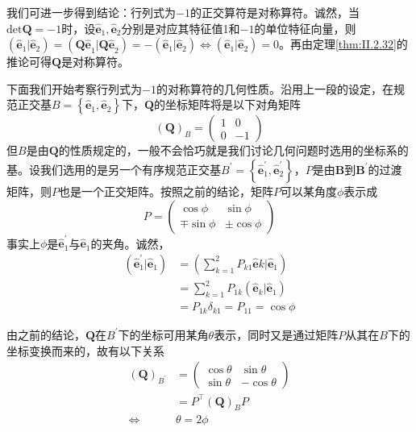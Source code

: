 \documentclass[main.tex]{subfiles}
\begin{document}
我们可进一步得到结论：行列式为$-1$的正交算符是对称算符。诚然，当$\mathrm{det}\mathbf{Q}=-1$时，设$\mathbf{\hat{e}}_1,\mathbf{\hat{e}}_2$分别是对应其特征值1和$-1$的单位特征向量，则$\left(\mathbf{\hat{e}}_1|\mathbf{\hat{e}}_2\right)=\left(\mathbf{Q\hat{e}}_1|\mathbf{Q\hat{e}}_2\right)=-\left(\mathbf{\hat{e}}_1|\mathbf{\hat{e}}_2\right)\Leftrightarrow\left(\mathbf{\hat{e}}_1|\mathbf{\hat{e}}_2\right)=0$。再由定理\ref{thm:II.2.32}的推论可得$\mathbf{Q}$是对称算符。

下面我们开始考察行列式为$-1$的对称算符的几何性质。沿用上一段的设定，在规范正交基$B=\left\{\mathbf{\hat{e}}_1,\mathbf{\hat{e}}_2\right\}$下，$\mathbf{Q}$的坐标矩阵将是以下对角矩阵
\[\left(\mathbf{Q}\right)_B=\left(\begin{array}{cc}1&0\\0&-1\end{array}\right)\]
但$B$是由$\mathbf{Q}$的性质规定的，一般不会恰巧就是我们讨论几何问题时选用的坐标系的基。设我们选用的是另一个有序规范正交基$B^\prime=\left\{\mathbf{\hat{e}}^\prime_1,\mathbf{\hat{e}}^\prime_2\right\}$，$P$是由$\mathbf{B}$到$\mathbf{B}^\prime$的过渡矩阵，则$P$也是一个正交矩阵。按照之前的结论，矩阵$P$可以某角度$\phi$表示成
\[P=\left(\begin{array}{cc}\cos\phi&\sin\phi\\\mp\sin\phi&\pm\cos\phi\end{array}\right)\]
事实上$\phi$是$\mathbf{\hat{e}}^\prime_1$与$\mathbf{\hat{e}}_1$的夹角。诚然，
\begin{align*}
    \left(\mathbf{\hat{e}}^\prime_1|\mathbf{\hat{e}}_1\right) & =\left(\sum_{k=1}^2P_{k1}\mathbf{\hat{e}}k|\mathbf{\hat{e}}_1\right)  \\
                                                              & =\sum_{k=1}^2P_{1k}\left(\mathbf{\hat{e}}_k|\mathbf{\hat{e}}_1\right) \\
                                                              & =P_{1k}\delta_{k1}=P_{11}=\cos\phi
\end{align*}

由之前的结论，$\mathbf{Q}$在$B^\prime$下的坐标可用某角$\theta$表示，同时又是通过矩阵$P$从其在$B$下的坐标变换而来的，故有以下关系
\begin{align*}
    \left(\mathbf{Q}\right)_{B^\prime} & =\left(\begin{array}{cc}\cos\theta&\sin\theta\\\sin\theta&-\cos\theta\end{array}\right) \\
                                       & =P^{\intercal}\left(\mathbf{Q}\right)_BP                                                \\
    \Leftrightarrow                    & \theta=2\phi
\end{align*}
\end{document}
